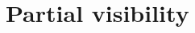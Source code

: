 \documentclass[letterpaper, 10 pt, conference]{IEEEtran}  %
\begin{document}
%
%


\section{Partial visibility}\label{sec:partial}
\end{document}
